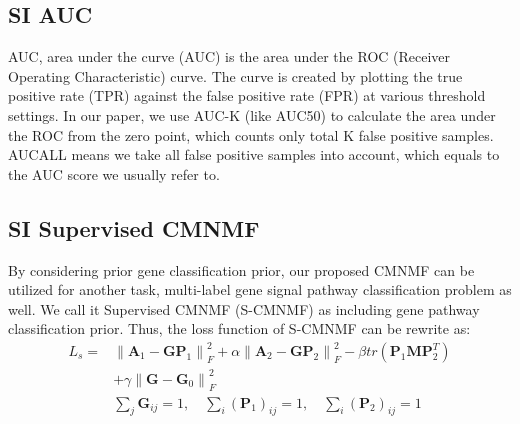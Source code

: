 \documentclass{article}
\begin{document}
\subsection*{\textbf{SI AUC}}
AUC, area under the curve (AUC) is the area under the ROC (Receiver Operating Characteristic) curve. The curve is created by plotting the true positive rate (TPR) against the false positive rate (FPR) at various threshold settings. In our paper, we use AUC-K (like AUC50) to calculate the area under the ROC from the zero point, which counts only total K false positive samples. AUCALL means we take all false positive samples into account, which equals to the AUC score we usually refer to.
\subsection*{\textbf{SI Supervised CMNMF}}
By considering prior gene classification prior, our proposed CMNMF can be utilized for another task, multi-label gene signal pathway classification problem as well. We call it Supervised CMNMF (S-CMNMF) as including gene pathway classification prior. Thus, the loss function of S-CMNMF can be rewrite as:
\begin{equation}\label{obj:Sup-CMNMF}
\begin{split}
L_s =
&\left\| {{\bm{A}_1} - \bm{G}{\bm{P}_1}} \right\|_F^2 + \alpha \left\| {{\bm{A}_2} - \bm{G}{\bm{P}_2}} \right\|_F^2 - \beta tr({\bm{P}_1}\bm{MP}_2^T)\\
&+\gamma\left\| {\bm{G} - {\bm{G}_0}}\right\|_F^2
\\
&\sum_j\bm{G}_{ij}=1,\quad \sum_i{(\bm{P}_1)}_{ij}=1,\quad \sum_i{(\bm{P}_2)}_{ij}=1
\end{split}
\end{equation}
\end{document}
